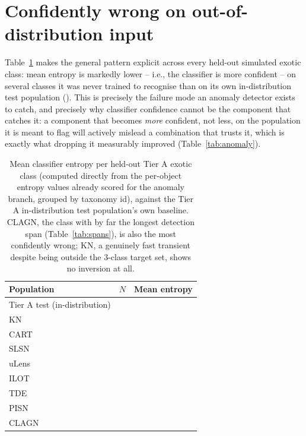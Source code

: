 \section{Confidently wrong on out-of-distribution input}

Table~\ref{tab:entropybyclass} makes the general pattern explicit across
every held-out simulated exotic class: mean entropy is markedly lower --
i.e., the classifier is more confident -- on several classes it was never
trained to recognise than on its own in-distribution test population
(\EntropyTierANormal{}). This is precisely the failure mode an anomaly
detector exists to catch, and precisely why classifier confidence cannot be
the component that catches it: a component that becomes \emph{more}
confident, not less, on the population it is meant to flag will actively
mislead a combination that trusts it, which is exactly what dropping it
measurably improved (Table~\ref{tab:anomaly}).

\begin{table}[htb]
\centering
\caption{Mean classifier entropy per held-out Tier A exotic class (computed
directly from the per-object entropy values already scored for the anomaly
branch, grouped by taxonomy id), against the Tier A in-distribution test
population's own baseline. CLAGN, the class with by far the longest
detection span (Table~\ref{tab:spans}), is also the most confidently wrong;
KN, a genuinely fast transient despite being outside the 3-class target
set, shows no inversion at all.}
\label{tab:entropybyclass}
\begin{tabular}{lrr}
\toprule
Population & $N$ & Mean entropy \\
\midrule
Tier A test (in-distribution) & \AnomalyTierANNormal{} & \EntropyTierANormal{} \\
KN & \ExoticNKN{} & \ExoticEntropyKN{} \\
CART & \ExoticNCART{} & \ExoticEntropyCART{} \\
SLSN & \ExoticNSLSN{} & \ExoticEntropySLSN{} \\
uLens & \ExoticNuLens{} & \ExoticEntropyuLens{} \\
ILOT & \ExoticNILOT{} & \ExoticEntropyILOT{} \\
TDE & \ExoticNTDE{} & \ExoticEntropyTDE{} \\
PISN & \ExoticNPISN{} & \ExoticEntropyPISN{} \\
CLAGN & \ExoticNCLAGN{} & \ExoticEntropyCLAGN{} \\
\bottomrule
\end{tabular}
\end{table}

